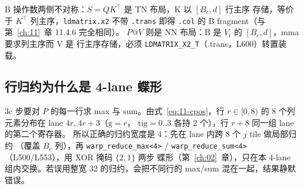 B 操作数两侧不对称：$S=QK^\top$ 是 TN 布局，K 以 $[B_c,d]$ 行主序
存储，等价于 $K^\top$ 列主序，\texttt{ldmatrix.x2} 不带 \texttt{.trans}
即得 \texttt{.col} 的 B fragment（与第~\ref{ch:11}~章 11.4.6 完全相同）。
$P@V$ 则是 NN 布局：B 是 $V_t$ 的 $[B_c,d]$，mma 要求列主序而 V 是
行主序存储，必须 \texttt{LDMATRIX\_\allowbreak{}X2\_\allowbreak{}T}（.trans，L600）转置装载。

\subsection{行归约为什么是 4-lane 蝶形}

3c 步要对 $P$ 的每一行求 max 与 sum。由式~\ref{eq:11-cpos}，行
$r\in[0,8)$ 的 8 个列元素分布在 lane $4r..4r{+}3$（$\mathrm{g}=r$，
$\mathrm{tig}=0..3$ 各持 2 个），行 $r{+}8$ 同一组 lane 的第二个寄存器。
所以正确的归约宽度是 4：先在 lane 内跨 8 个 $j$ tile 做局部归约
（覆盖 $B_c$ 列），再 \texttt{warp\_\allowbreak{}reduce\_\allowbreak{}max\allowbreak{}<4>} /
\texttt{warp\_\allowbreak{}reduce\_\allowbreak{}sum\allowbreak{}<4>}（L500/L553），用 XOR 掩码 $\{2,1\}$ 两步
蝶形（第~\ref{ch:02}~章），只在本 4-lane 组内交换。若误用整宽 32
的归约，会把不同行的 max/sum 混在一起，结果静默错误。


